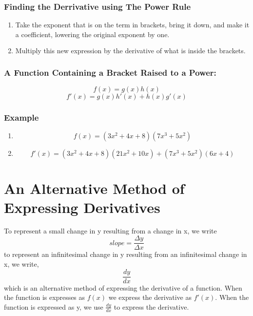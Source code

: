 \documentclass[a4paper,11pt]{book}
\begin{document}
\subsubsection{Finding the Derrivative using The Power Rule}
\begin{enumerate}
  \item Take the exponent that is on the term in brackets, bring it down, and make it a coefficient, lowering the original exponent by one.
  \item Multiply this new expression by the derivative of what is inside the brackets.
\end{enumerate}

\subsubsection{A Function Containing a Bracket Raised to a Power:}
\LARGE 
\[ f(x) = g(x)h(x) \]
\[ f'(x) = g(x)h'(x) + h(x)g'(x) \]

\subsubsection{Example}
\LARGE 
\begin{enumerate}
  \item \[ f(x) = (3x^2 + 4x + 8)(7x^3 + 5x^2) \]
  \item \[ f'(x) = (3x^2 + 4x + 8)(21x^2 + 10x) + (7x^3 + 5x^2)(6x + 4) \]
\end{enumerate}
\normalsize 










\section{An Alternative Method of Expressing Derivatives}
To represent a small change in y resulting from a change in x, we write
\LARGE
\[ slope= \frac{\Delta y}{\Delta x} \]
\normalsize 
to represent an infinitesimal change in y resulting from an infinitesimal change in x, we write,
\LARGE \[ \frac{dy}{dx} \]
\normalsize
which is an alternative method of expressing the derivative of a function. When the function is expresses as $ f(x) $ we express the derivative as $ f'(x) $. When the function is expressed as y, we use $ \frac{dy}{dx} $ to express the derivative.
\end{document}
